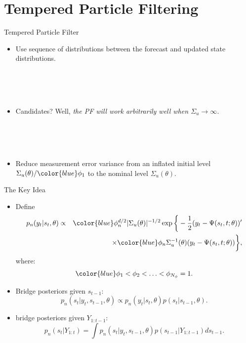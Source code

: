 \documentclass[presentation]{beamer}
\begin{document}
\section{Tempered Particle Filtering}
\label{sec:org615ec00}

\begin{frame}[label={sec:orgecf662b}]{Tempered Particle Filter}
\begin{itemize}
\item Use sequence of distributions between the forecast and updated state distributions.
\end{itemize}
\\~\\~     
\begin{itemize}
\item Candidates? Well, \emph{the PF will work arbitrarily well when \(\Sigma_{u}\rightarrow\infty\).}
\end{itemize}
\\~\\~     
\begin{itemize}
\item \alert{Reduce measurement error variance from an inflated initial level}
\(\Sigma_u(\theta)/{\color{blue}\phi_1}\) to the nominal level \(\Sigma_u(\theta)\).
\end{itemize}
\end{frame}

\begin{frame}[label={sec:orgf058353}]{The Key Idea}
\begin{itemize}
\item Define
\begin{eqnarray*} p_n(y_t|s_t,\theta) &\propto& {\color{blue}\phi_n^{d/2}}
|\Sigma_u(\theta)|^{-1/2}\exp \bigg\{ - \frac{1}{2} (y_t - \Psi(s_t,t;\theta))' \\
&& \times {\color{blue}\phi_n} \Sigma_u^{-1}(\theta)(y_t - \Psi(s_t,t;\theta)) \bigg\},
\end{eqnarray*}
where:
\[
      {\color{blue} \phi_1 < \phi_2 < \ldots < \phi_{N_\phi} = 1}.
      \]
\item \alert{Bridge posteriors given \(s_{t-1}\):}
\[
      p_n(s_t|y_t,s_{t-1},\theta)
        \propto p_n(y_t|s_t,\theta) p(s_t|s_{t-1},\theta).
      \]
\item \alert{bridge posteriors given \(Y_{1:t-1}\):}
\[
      p_n(s_t|Y_{1:t})= \int p_n(s_t|y_t,s_{t-1},\theta) p(s_{t-1}|Y_{1:t-1}) ds_{t-1}.
      \]
\end{itemize}
\end{frame}
\end{document}
